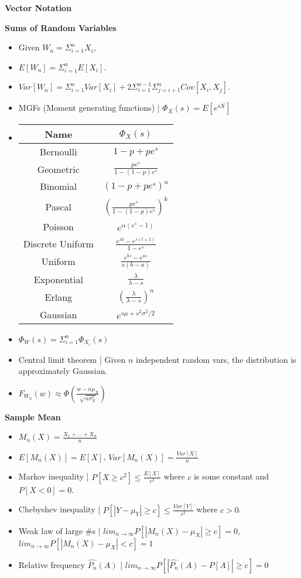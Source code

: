 \documentclass[8pt]{article}
\begin{document}
\textbf{Vector Notation}
\begin{itemize}
\end{itemize}
\textbf{Sums of Random Variables}
\begin{itemize}
    \item Given $W_n = \Sigma_{i = 1}^n X_i$,
    \item $E[W_n] = \Sigma_{i = 1}^n E[X_i]$.
    \item $Var[W_n] = \Sigma_{i = 1}^n Var[X_i] + 2 \Sigma_{i = 1}^{n - 1} \Sigma_{j = i + 1}^n Cov[X_i, X_j]$.
    \item MGFs (Moment generating functions) | $\Phi_X(s) = E[e^{sX}]$
    \item
    \begin{tabular}{|c|c|}
        \hline
        Name & $\Phi_X(s)$ \\
        \hline
        Bernoulli & $1 - p + pe^s$ \\
        Geometric & $\frac{pe^s}{1 - (1 - p)e^s}$ \\
        Binomial & $(1 - p + pe^s)^n$  \\
        Pascal & $(\frac{pe^s}{1 - (1 - p)e^s})^k$ \\
        Poisson & $e^{\alpha(e^s - 1)}$ \\
        Discrete Uniform & $\frac{e^{sk} - e^{s(l + 1)}}{1 - e^s}$ \\
        Uniform & $\frac{e^{bs} - e^{as}}{s(b - a)}$ \\
        Exponential & $\frac{\lambda}{\lambda - s}$ \\
        Erlang & $\left(\frac{\lambda}{\lambda - s}\right)^n$ \\
        Gaussian & $e^{s\mu + s^2\sigma^2/2}$ \\
        \hline
    \end{tabular}
    \item $\Phi_W(s) = \Sigma_{i = 1}^n \Phi_{X_i}(s)$
    \item Central limit theorem | Given $n$ independent random vars, the distribution is approximately Gaussian.
    \item $F_{W_n}(w) \approx \Phi\left(\frac{w - n \mu_X}{\sqrt{n \sigma_X^2}}\right)$
\end{itemize}
\textbf{Sample Mean}
\begin{itemize}
    \item $M_n(X) = \frac{X_1 + \dots + X_n}{n}$
    \item $E[M_n(X)] = E[X]$, $Var[M_n(X)] = \frac{Var[X]}{n}$
    \item Markov inequality | $P[X \geq c^2] \leq \frac{E[X]}{c^2}$ where $c$ is some constant and $P[X < 0] = 0$.
    \item Chebyshev inequality | $P[|Y - \mu_Y| \geq c] \leq \frac{Var[Y]}{c^2}$ where $c > 0$.
    \item Weak law of large \#s | $lim_{n \rightarrow \infty} P[|M_n(X) - \mu_X| \geq c] = 0$, $lim_{n \rightarrow \infty} P[|M_n(X) - \mu_X| < c] = 1$
    \item Relative frequency $\hat{P_n}(A)$ | $lim_{n \rightarrow \infty} P[|\hat{P_n}(A) - P[A]| \geq c] = 0$
\end{itemize}
\end{document}

